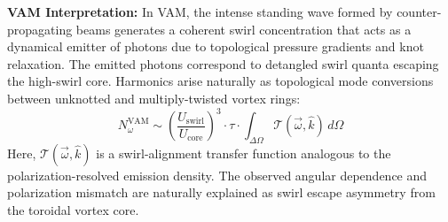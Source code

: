 \textbf{VAM Interpretation:} In VAM, the intense standing wave formed by counter-propagating beams generates a coherent swirl concentration that acts as a dynamical emitter of photons due to topological pressure gradients and knot relaxation. The emitted photons correspond to detangled swirl quanta escaping the high-swirl core. Harmonics arise naturally as topological mode conversions between unknotted and multiply-twisted vortex rings:
\begin{equation}
N_{\omega}^\text{VAM} \sim \left(\frac{U_\text{swirl}}{U_\text{core}}\right)^3 \cdot \tau \cdot \int_{\Delta \Omega} \mathcal{T}(\vec{\omega}, \hat{k}) \, d\Omega
\end{equation}
Here, $\mathcal{T}(\vec{\omega}, \hat{k})$ is a swirl-alignment transfer function analogous to the polarization-resolved emission density. The observed angular dependence and polarization mismatch are naturally explained as swirl escape asymmetry from the toroidal vortex core.
